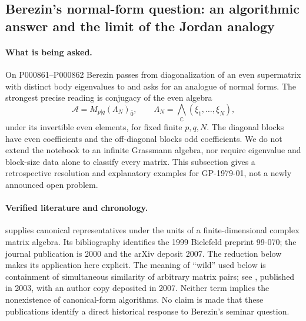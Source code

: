 \subsection{Berezin's normal-form question: an algorithmic answer and the limit of the Jordan analogy}
\label{dev:berezin-normal}

\paragraph{What is being asked.}
On P000861--P000862 Berezin passes from diagonalization of an even supermatrix with distinct body eigenvalues to  and asks for an analogue of normal forms. The strongest precise reading is conjugacy of the even algebra
\[
 \mathcal A=M_{p|q}(\Lambda_N)_{\bar0},\qquad
 \Lambda_N=\bigwedge_{\mathbb C}(\xi_1,\ldots,\xi_N),
\]
under its invertible even elements, for fixed finite \(p,q,N\). The diagonal blocks have even coefficients and the off-diagonal blocks odd coefficients. We do not extend the notebook to an infinite Grassmann algebra, nor require eigenvalue and block-size data alone to classify every matrix. This subsection gives a retrospective resolution and explanatory examples for GP-1979-01, not a newly announced open problem.

\paragraph{Verified literature and chronology.}
\citet[Theorems~1.1 and~1.3; \S1.4]{sergeichuk2000canonical} supplies canonical representatives under the units of a finite-dimensional complex matrix algebra. Its bibliography identifies the 1999 Bielefeld preprint 99-070; the journal publication is 2000 and the arXiv deposit 2007. The reduction below makes its application here explicit. The meaning of ``wild'' used below is containment of simultaneous similarity of arbitrary matrix pairs; see \citet[\S1 and Theorem~1.1]{belitskiisergeichuk2003complexity}, published in 2003, with an author copy deposited in 2007. Neither term implies the nonexistence of canonical-form algorithms. No claim is made that these publications identify a direct historical response to Berezin's seminar question.

